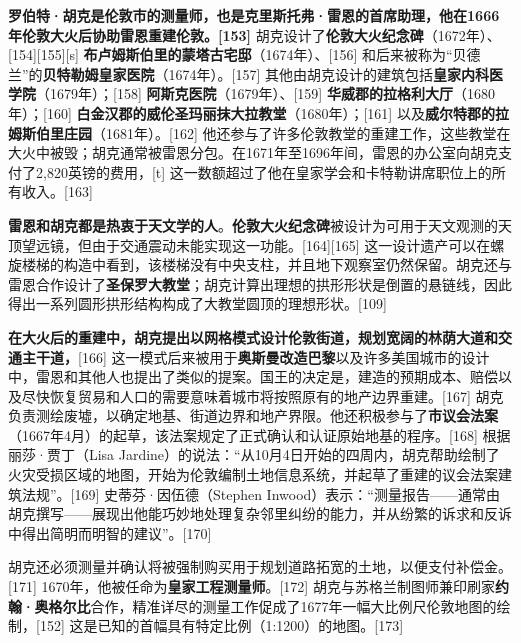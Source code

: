 \textbf{罗伯特·胡克是伦敦市的测量师，也是克里斯托弗·雷恩的首席助理，他在1666年伦敦大火后协助雷恩重建伦敦。[153]} 胡克设计了\textbf{伦敦大火纪念碑}（1672年）、[154][155][s] \textbf{布卢姆斯伯里的蒙塔古宅邸}（1674年）、[156] 和后来被称为“贝德兰”的\textbf{贝特勒姆皇家医院}（1674年）。[157] 其他由胡克设计的建筑包括\textbf{皇家内科医学院}（1679年）；[158] \textbf{阿斯克医院}（1679年）、[159] \textbf{华威郡的拉格利大厅}（1680年）；[160] \textbf{白金汉郡的威伦圣玛丽抹大拉教堂}（1680年）；[161] 以及\textbf{威尔特郡的拉姆斯伯里庄园}（1681年）。[162] 他还参与了许多伦敦教堂的重建工作，这些教堂在大火中被毁；胡克通常被雷恩分包。在1671年至1696年间，雷恩的办公室向胡克支付了2,820英镑的费用，[t] 这一数额超过了他在皇家学会和卡特勒讲席职位上的所有收入。[163]  

\textbf{雷恩和胡克都是热衷于天文学的人}。\textbf{伦敦大火纪念碑}被设计为可用于天文观测的天顶望远镜，但由于交通震动未能实现这一功能。[164][165] 这一设计遗产可以在螺旋楼梯的构造中看到，该楼梯没有中央支柱，并且地下观察室仍然保留。胡克还与雷恩合作设计了\textbf{圣保罗大教堂}；胡克计算出理想的拱形形状是倒置的悬链线，因此得出一系列圆形拱形结构构成了大教堂圆顶的理想形状。[109]  

\textbf{在大火后的重建中，胡克提出以网格模式设计伦敦街道，规划宽阔的林荫大道和交通主干道，}[166] 这一模式后来被用于\textbf{奥斯曼改造巴黎}以及许多美国城市的设计中，雷恩和其他人也提出了类似的提案。国王的决定是，建造的预期成本、赔偿以及尽快恢复贸易和人口的需要意味着城市将按照原有的地产边界重建。[167] 胡克负责测绘废墟，以确定地基、街道边界和地产界限。他还积极参与了\textbf{市议会法案}（1667年4月）的起草，该法案规定了正式确认和认证原始地基的程序。[168] 根据丽莎·贾丁（Lisa Jardine）的说法：“从10月4日开始的四周内，胡克帮助绘制了火灾受损区域的地图，开始为伦敦编制土地信息系统，并起草了重建的议会法案建筑法规”。[169] 史蒂芬·因伍德（Stephen Inwood）表示：“测量报告——通常由胡克撰写——展现出他能巧妙地处理复杂邻里纠纷的能力，并从纷繁的诉求和反诉中得出简明而明智的建议”。[170]  

胡克还必须测量并确认将被强制购买用于规划道路拓宽的土地，以便支付补偿金。[171] 1670年，他被任命为\textbf{皇家工程测量师}。[172] 胡克与苏格兰制图师兼印刷家\textbf{约翰·奥格尔比}合作，精准详尽的测量工作促成了1677年一幅大比例尺伦敦地图的绘制，[152] 这是已知的首幅具有特定比例（1:1200）的地图。[173]